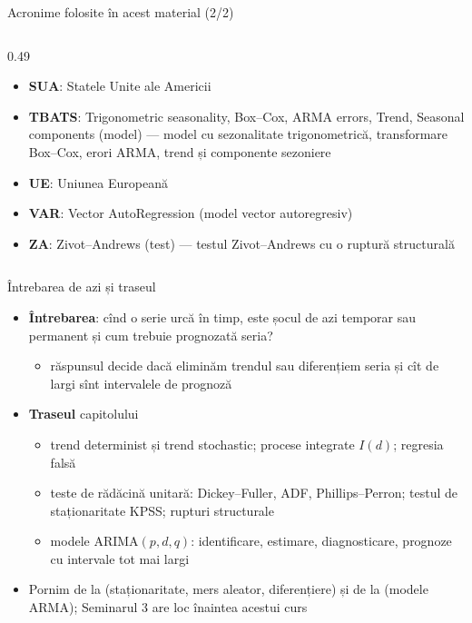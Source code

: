 \begin{frame}{Acronime folosite în acest material (2/2)}
\begin{columns}[T]
\begin{column}{0.49\textwidth}
\begin{itemize}
    \item \textbf{SUA}: Statele Unite ale Americii
    \item \textbf{TBATS}: Trigonometric seasonality, Box–Cox, ARMA errors, Trend, Seasonal components (model) — model cu sezonalitate trigonometrică, transformare Box–Cox, erori ARMA, trend și componente sezoniere
    \item \textbf{UE}: Uniunea Europeană
    \item \textbf{VAR}: Vector AutoRegression (model vector autoregresiv)
    \item \textbf{ZA}: Zivot–Andrews (test) — testul Zivot–Andrews cu o ruptură structurală
\end{itemize}
\end{column}
\end{columns}
\end{frame}

\begin{frame}{Întrebarea de azi și traseul}
\itemsize{\small}
\begin{itemize}
    \item \textbf{Întrebarea}: cînd o serie urcă în timp, este șocul de azi temporar sau permanent și cum trebuie prognozată seria?
    \begin{itemize}
        \item răspunsul decide dacă eliminăm trendul sau diferențiem seria și cît de largi sînt intervalele de prognoză
    \end{itemize}
    \item \textbf{Traseul} capitolului
    \begin{itemize}
        \item trend determinist și trend stochastic; procese integrate $I(d)$; regresia falsă
        \item teste de rădăcină unitară: Dickey--Fuller, ADF, Phillips--Perron; testul de staționaritate KPSS; rupturi structurale
        \item modele ARIMA$(p,d,q)$: identificare, estimare, diagnosticare, prognoze cu intervale tot mai largi
    \end{itemize}
    \item Pornim de la  (staționaritate, mers aleator, diferențiere) și de la  (modele ARMA); Seminarul 3 are loc înaintea acestui curs
\end{itemize}
\end{frame}

